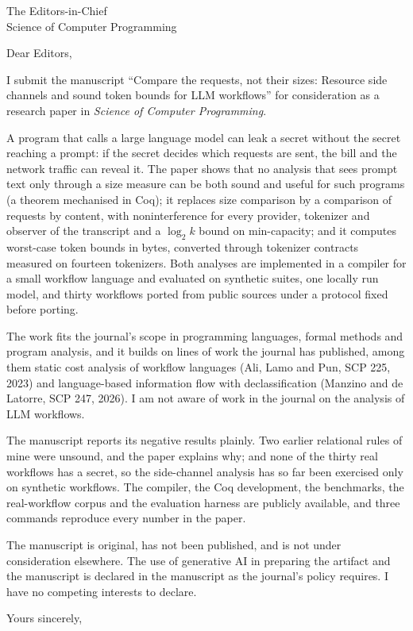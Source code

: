 \documentclass[11pt]{letter}
\begin{document}
\begin{letter}{The Editors-in-Chief\\Science of Computer Programming}
\opening{Dear Editors,}

I submit the manuscript ``Compare the requests, not their sizes: Resource side channels
and sound token bounds for LLM workflows'' for consideration as a research paper in
\emph{Science of Computer Programming}.

A program that calls a large language model can leak a secret without the secret reaching a
prompt: if the secret decides which requests are sent, the bill and the network traffic can
reveal it. The paper shows that no analysis that sees prompt text only through a size
measure can be both sound and useful for such programs (a theorem mechanised in Coq); it
replaces size comparison by a comparison of requests by content, with noninterference for
every provider, tokenizer and observer of the transcript and a $\log_2 k$ bound on
min-capacity; and it computes worst-case token bounds in bytes, converted through tokenizer
contracts measured on fourteen tokenizers. Both analyses are implemented in a compiler for a
small workflow language and evaluated on synthetic suites, one locally run model, and thirty
workflows ported from public sources under a protocol fixed before porting.

The work fits the journal's scope in programming languages, formal methods and program
analysis, and it builds on lines of work the journal has published, among them static cost
analysis of workflow languages (Ali, Lamo and Pun, SCP 225, 2023) and language-based
information flow with declassification (Manzino and de Latorre, SCP 247, 2026). I am not
aware of work in the journal on the analysis of LLM workflows.

The manuscript reports its negative results plainly. Two earlier relational rules of mine
were unsound, and the paper explains why; and none of the thirty real workflows has a
secret, so the side-channel analysis has so far been exercised only on synthetic workflows.
The compiler, the Coq development, the benchmarks, the real-workflow corpus and the
evaluation harness are publicly available, and three commands reproduce every number in
the paper.

The manuscript is original, has not been published, and is not under consideration
elsewhere. The use of generative AI in preparing the artifact and the manuscript is
declared in the manuscript as the journal's policy requires. I have no competing interests
to declare.

\closing{Yours sincerely,}
\end{letter}
\end{document}
